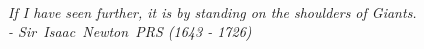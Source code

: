 

{
\thispagestyle{empty}
~\vfill

\begin{doublespace}
\noindent\fontsize{16}{22}\selectfont\itshape
\nohyphenation
If I have seen further, it is by standing on the shoulders of Giants.\\
\noindent - \mbox{Sir Isaac Newton PRS} (1643 - 1726)
\end{doublespace}

\vfill
\vfill
}
